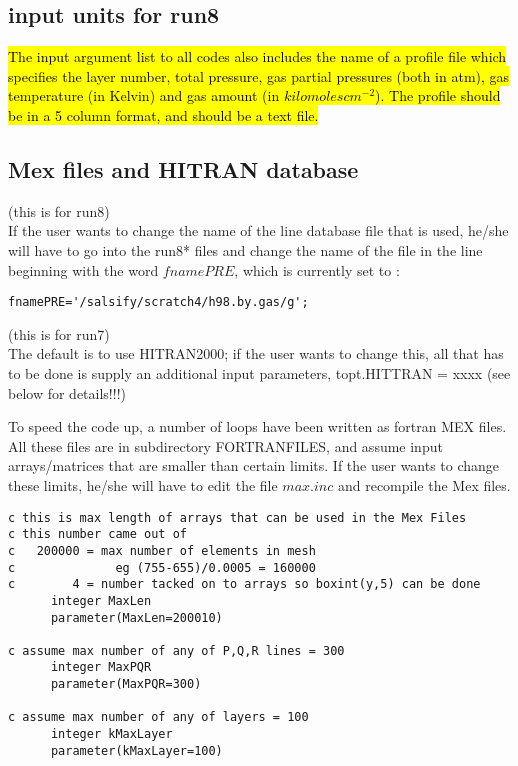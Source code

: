 \documentclass[11pt]{article}
\begin{document}
\subsection{input units for run8}
\hl{The input argument list to all codes also includes the name of a profile file 
which specifies the layer number, total pressure, gas partial 
pressures (both in atm), gas temperature (in Kelvin) and gas amount 
(in $kilomoles cm^{-2}$). The profile should be in a 5 column format, 
and should be a text file.}

\subsection{Mex files and HITRAN database}
(this is for run8) \\
If the user wants to change the name of the line database file that is used,
he/she will have to go into the run8* files and change the name of the 
file in the line beginning with the word $fnamePRE$, which is currently 
set to :
\begin{verbatim}
fnamePRE='/salsify/scratch4/h98.by.gas/g';
\end{verbatim}

(this is for run7) \\
The default is to use HITRAN2000; if the user wants to change this, all that
has to be done is supply an additional input parameters, topt.HITTRAN = xxxx
(see below for details!!!)

To speed the code up, a number of loops have been written as fortran MEX 
files. All these files are in subdirectory FORTRANFILES, and assume input 
arrays/matrices that are smaller than certain limits. If the user wants to 
change these limits, he/she will have to edit the file $max.inc$ and 
recompile the Mex files.

\begin{verbatim}
c this is max length of arrays that can be used in the Mex Files  
c this number came out of 
c   200000 = max number of elements in mesh 
c              eg (755-655)/0.0005 = 160000
c        4 = number tacked on to arrays so boxint(y,5) can be done  
      integer MaxLen
      parameter(MaxLen=200010)

c assume max number of any of P,Q,R lines = 300
      integer MaxPQR
      parameter(MaxPQR=300)

c assume max number of any of layers = 100
      integer kMaxLayer
      parameter(kMaxLayer=100)
\end{verbatim}
\end{document}
